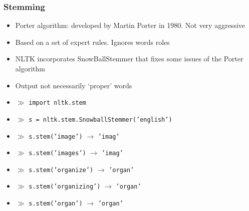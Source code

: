 \documentclass{beamer}
\begin{document}
\begin{frame}

    \frametitle{Stemming}
    
        \begin{block}{}
        \begin{itemize}
            \item Porter algorithm:  developed by Martin Porter in 1980. Not very aggressive
            \item Based on a set of expert rules. Ignores words roles
            \item NLTK incorporates SnowBallStemmer that fixes some issues of the Porter algorithm
            \item Output not necessarily `proper' words
        \end{itemize}
        \end{block}

        \footnotesize
        \begin{itemize}
    		\item[] $\gg$ {\tt import nltk.stem}
    		\item[] $\gg$ {\tt s = nltk.stem.SnowballStemmer('english')}
    		\item[] $\gg$ {\tt s.stem('image')} $\rightarrow$ {\tt 'imag'}
    		\item[] $\gg$ {\tt s.stem('images')} $\rightarrow$ {\tt 'imag'}
    		\item[] $\gg$ {\tt s.stem('organize')} $\rightarrow$ {\tt 'organ'}
    		\item[] $\gg$ {\tt s.stem('organizing')} $\rightarrow$ {\tt 'organ'}
			\item[] $\gg$ {\tt s.stem('organ')} $\rightarrow$ {\tt 'organ'}
    	\end{itemize}

\end{frame}
\end{document}
